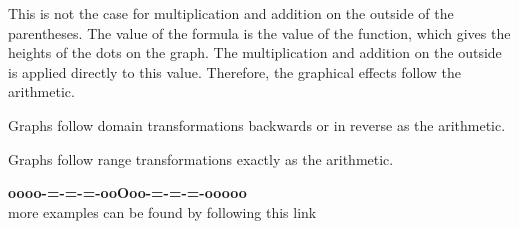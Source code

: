 \documentclass{ximera}
\begin{document}
This is not the case for multiplication and addition on the outside of the parentheses.  The value of the formula is the value of the function, which gives the heights of the dots on the graph.  The multiplication and addition on the outside is applied directly to this value.  Therefore, the graphical effects follow the arithmetic.


\begin{center}

Graphs follow domain transformations backwards or in reverse as the arithmetic.


\end{center}


\begin{center}

Graphs follow range transformations exactly as the arithmetic.


\end{center}






































\begin{onlineOnly}
\begin{center}
\textbf{\textcolor{green!50!black}{oooo-=-=-=-ooOoo-=-=-=-ooooo}} \\

more examples can be found by following this link\\ 

\end{center}
\end{onlineOnly}
\end{document}
